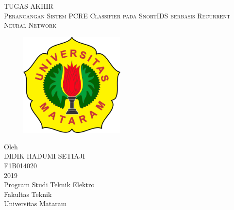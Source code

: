 \documentclass[a4paper, 11pt, oneside]{book}
\begin{document}
 
\begin{titlepage}
	\centering 
	\scshape 
	\vspace*{\baselineskip} 
	\vspace{0.75\baselineskip} 
	{TUGAS AKHIR\\
	\vspace{0.\baselineskip}
	Perancangan Sistem PCRE Classifier pada SnortIDS berbasis Recurrent Neural Network\\}
	\vspace{0.75\baselineskip}
	\vspace{2\baselineskip} 
	\begin{figure}[h!]
	\begin{center}
	    \includegraphics[width=150pt]{skripsi/logo}
	\end{center}
	\end{figure}
	\vspace*{3\baselineskip} 
	Oleh \\
	\vspace{0.5\baselineskip} 
	{\scshape\Large DIDIK HADUMI SETIAJI \\ F1B014020 \\} 
	\vspace{0.5\baselineskip} 
	\vfill
	\vspace{0.3\baselineskip} 
	2019 \\
	{\large Program Studi Teknik Elektro \\ Fakultas Teknik \\ Universitas Mataram} 
\end{titlepage}
\end{document}
